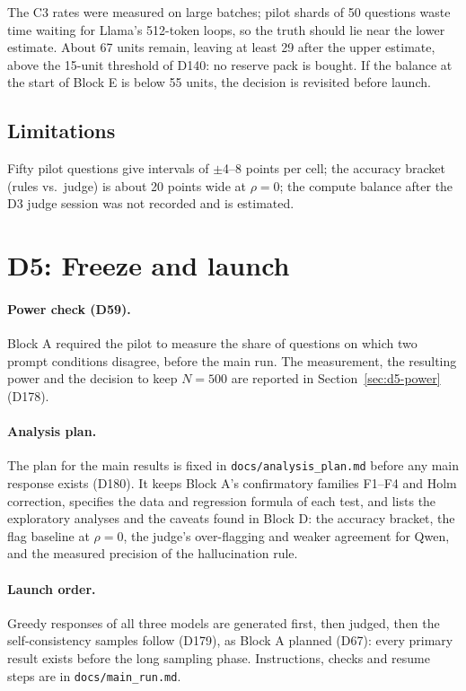 \documentclass[11pt,a4paper]{report}
\begin{document}
The C3 rates were measured on large batches; pilot shards of 50 questions waste
time waiting for Llama's 512-token loops, so the truth should lie near the
lower estimate. About 67 units remain, leaving at least 29 after the upper
estimate, above the 15-unit threshold of D140: no reserve pack is bought. If
the balance at the start of Block E is below 55 units, the decision is
revisited before launch.

\subsection{Limitations}
Fifty pilot questions give intervals of $\pm$4--8 points per cell; the
accuracy bracket (rules vs.\ judge) is about 20 points wide at $\rho=0$; the
compute balance after the D3 judge session was not recorded and is estimated.


\section{D5: Freeze and launch}

\paragraph{Power check (D59).} Block A required the pilot to measure the share
of questions on which two prompt conditions disagree, before the main run. The
measurement, the resulting power and the decision to keep $N=500$ are reported
in Section~\ref{sec:d5-power} (D178).

\paragraph{Analysis plan.} The plan for the main results is fixed in
\texttt{docs/analysis\_plan.md} before any main response exists (D180). It
keeps Block A's confirmatory families F1--F4 and Holm correction, specifies
the data and regression formula of each test, and lists the exploratory
analyses and the caveats found in Block D: the accuracy bracket, the flag
baseline at $\rho=0$, the judge's over-flagging and weaker agreement for Qwen,
and the measured precision of the hallucination rule.

\paragraph{Launch order.} Greedy responses of all three models are generated
first, then judged, then the self-consistency samples follow (D179), as
Block A planned (D67): every primary result exists before the long sampling
phase. Instructions, checks and resume steps are in \texttt{docs/main\_run.md}.
\end{document}
